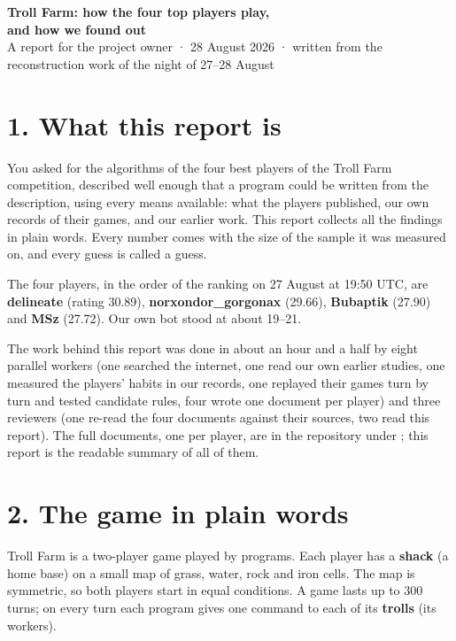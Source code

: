\documentclass[10pt,a4paper]{article}
\begin{document}
{\LARGE\bfseries Troll Farm: how the four top players play,\\[2pt] and how we found out}\\[6pt]
{\color{muted}A report for the project owner · 28 August 2026 · written from the reconstruction work of the night of 27--28 August}

\vspace{6pt}
\section*{1. What this report is}

You asked for the algorithms of the four best players of the Troll Farm competition, described well enough that a program could be written from the description, using every means available: what the players published, our own records of their games, and our earlier work. This report collects all the findings in plain words. Every number comes with the size of the sample it was measured on, and every guess is called a guess.

The four players, in the order of the ranking on 27 August at 19:50 UTC, are \textbf{delineate} (rating 30.89), \textbf{norxondor\_gorgonax} (29.66), \textbf{Bubaptik} (27.90) and \textbf{MSz} (27.72). Our own bot stood at about 19--21.

The work behind this report was done in about an hour and a half by eight parallel workers (one searched the internet, one read our own earlier studies, one measured the players' habits in our records, one replayed their games turn by turn and tested candidate rules, four wrote one document per player) and three reviewers (one re-read the four documents against their sources, two read this report). The full documents, one per player, are in the repository under ; this report is the readable summary of all of them.

\section*{2. The game in plain words}

Troll Farm is a two-player game played by programs. Each player has a \textbf{shack} (a home base) on a small map of grass, water, rock and iron cells. The map is symmetric, so both players start in equal conditions. A game lasts up to 300 turns; on every turn each program gives one command to each of its \textbf{trolls} (its workers).
\end{document}
